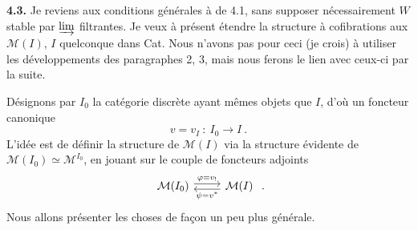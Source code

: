 \textbf{4.3.} Je reviens aux conditions générales à de 4.1, sans supposer nécessairement $W$ stable par $\varinjlim$ filtrantes. Je veux à présent étendre la structure à cofibrations aux $\mathcal{M}(I)$, $I$ quelconque dans Cat. Nous n'avons pas pour ceci (je crois) à utiliser les développements des paragraphes 2, 3, mais nous ferons le lien avec ceux-ci par la suite.

Désignons par $I_0$ la catégorie discrète ayant mêmes objets que $I$, d'où un foncteur canonique
\[
v = v_I \ :\ I_0 \longrightarrow I\ . \tag*{(4.9)}
\]
L'idée est de définir la structure de $\mathcal{M}(I)$ via la structure évidente de $\mathcal{M}(I_0) \simeq \mathcal{M}^{I_0}$, en jouant sur le couple de foncteurs adjoints
\[
\begin{tikzcd}
\mathcal{M}(I_0) \arrow[r, shift left, "\varphi = v_!"] & \mathcal{M}(I) \arrow[l, shift left, "\psi = v^*"]
\end{tikzcd}
\ .
\]
Nous allons présenter les choses de façon un peu plus générale.

